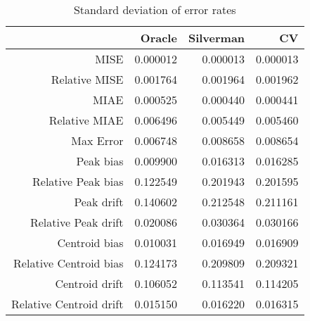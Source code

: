 \begin{table}[ht]
\centering
\begin{tabular}{rrrr}
  \hline
 & Oracle & Silverman & CV \\ 
  \hline
MISE & 0.000012 & 0.000013 & 0.000013 \\ 
  Relative MISE & 0.001764 & 0.001964 & 0.001962 \\ 
  MIAE & 0.000525 & 0.000440 & 0.000441 \\ 
  Relative MIAE & 0.006496 & 0.005449 & 0.005460 \\ 
  Max Error & 0.006748 & 0.008658 & 0.008654 \\ 
  Peak bias & 0.009900 & 0.016313 & 0.016285 \\ 
  Relative Peak bias & 0.122549 & 0.201943 & 0.201595 \\ 
  Peak drift & 0.140602 & 0.212548 & 0.211161 \\ 
  Relative Peak drift & 0.020086 & 0.030364 & 0.030166 \\ 
  Centroid bias & 0.010031 & 0.016949 & 0.016909 \\ 
  Relative Centroid bias & 0.124173 & 0.209809 & 0.209321 \\ 
  Centroid drift & 0.106052 & 0.113541 & 0.114205 \\ 
  Relative Centroid drift & 0.015150 & 0.016220 & 0.016315 \\ 
   \hline
\end{tabular}
\caption{Standard deviation of error rates} 
\label{tbl:stddev_error_rates}
\end{table}
